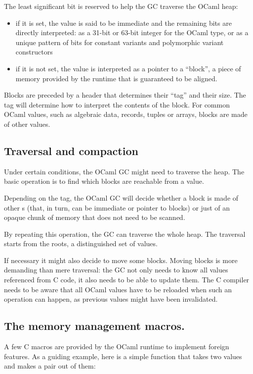 \documentclass[a4paper]{easychair}
\newcommand{\caml}[1]{\smash{\lstinline{#1}}}
\newcommand{\cpp}[1]{\smash{\lstinline[style=C++]{#1}}}
\begin{document}
The least significant bit is reserved to help the GC traverse the OCaml
heap:

\begin{itemize}
\item if it is set, the value is said to be immediate and the remaining bits
      are directly interpreted: as a 31-bit or 63-bit integer for the
      \caml{int} OCaml type, or as a unique pattern of bits for constant
      variants and polymorphic variant constructors
\item if it is not set, the value is interpreted as a pointer to a
      ``block'', a piece of memory provided by the runtime that is guaranteed
      to be aligned.
\end{itemize}

Blocks are preceded by a header that determines their ``tag'' and their
size. The tag will determine how to interpret the contents of the block.
For common OCaml values, such as algebraic data, records, tuples or
arrays, blocks are made of other values.

\subsection{Traversal and compaction}

Under certain conditions, the OCaml GC might need to traverse the heap.
The basic operation is to find which blocks are reachable from a value.

Depending on the tag, the OCaml GC will decide whether a block is made
of other \cpp{value}s (that, in turn, can be immediate or pointer to
blocks) or just of an opaque chunk of memory that does not need to be
scanned.

By repeating this operation, the GC can traverse the whole heap. The traversal
starts from the roots, a distinguished set of values.

If necessary it might also decide to move some blocks.  Moving blocks is more
demanding than mere traversal: the GC not only needs to know all values
referenced from C code, it also needs to be able to update them. The C compiler
needs to be aware that all OCaml values have to be reloaded when such an
operation can happen, as previous values might have been invalidated.

\subsection{The memory management macros.}

A few C macros are provided by the OCaml runtime to implement foreign
features. As a guiding example, here is a simple function that takes two
values and makes a pair out of them:
\end{document}
